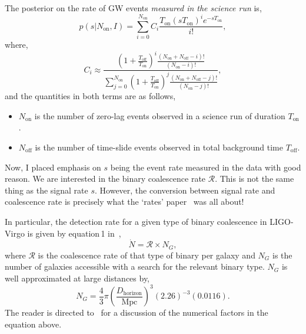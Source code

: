 \documentclass[nofootinbib]{revtex4}
\newcommand{\cbcrate}{{{\mathcal R}}}
\begin{document}
The posterior on the rate of GW events \emph{measured in the science run} is,
\begin{equation}\label{eq:signal_rate_posterior}
p(s | N_{\textrm{on}}, I) = \sum_{i=0}^{N_{\textrm{on}}} C_i
\frac{T_{\textrm{on}} (sT_{\textrm{on}})^i e^{-s T_{\textrm{on}} }}{i!},
\end{equation}
where,
\begin{equation}
C_i \approx \frac{ \left(1 + \frac{T_{\textrm{off}}}{T_{\textrm{on}}}\right)^i
\frac{(N_{\textrm{on}} + N_{\textrm{off}} - i )!}{(N_{\textrm{on}}-i)!} }
{\sum_{j=0}^{N_{\textrm{on}}} \left(1 +
\frac{T_{\textrm{off}}}{T_{\textrm{on}}}\right)^j\frac{(N_{\textrm{on}} +
N_{\textrm{off}} - j )!}{(N_{\textrm{on}}-j)!}},
\end{equation}
%
and the quantities in both terms are as follows,
\begin{itemize}
\item $N_{\textrm{on}}$ is the number of zero-lag events observed in a science
run of duration $T_{\textrm{on}}$.
\item $N_{\textrm{off}}$ is the number of time-slide events observed in total
background time $T_{\textrm{off}}$.
\end{itemize}
%
Now, I placed emphasis on $s$ being the event rate measured in the data with
good reason.  We are interested in the binary coalescence rate $\cbcrate$.  This
is not the same thing as the signal rate $s$.  However, the conversion between
signal rate and coalescence rate is precisely what the `rates'
paper~\cite{rates_paper} was all about!

In particular,  the detection rate for a given type of binary coalescence in
LIGO-Virgo is given by equation\,1 in~\cite{rates_paper},
\begin{equation}
\dot{N} = \cbcrate \times N_G,
\end{equation}
%
where $\cbcrate$ is the coalescence rate of that type of binary per galaxy and
$N_G$ is the number of galaxies accessible with a search for the relevant binary
type.  $N_G$ is well approximated at large distances by,
%
\begin{equation}
N_G = \frac{4}{3} \pi \left( \frac{D_{\textrm{horizon}}}{\textrm{Mpc}}
\right)^3 (2.26)^{-3} (0.0116).
\end{equation}
%
The reader is directed to~\cite{rates_paper} for a discussion of the numerical
factors in the equation above.
\end{document}
